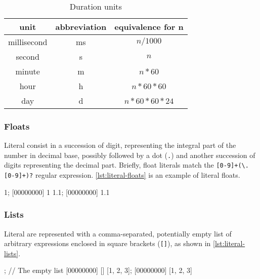 \begin{table}[\floatpos]
  \centering
  \begin{tabular}{|c|c|c|}
    \hline
    unit        & abbreviation & equivalence for n         \\
    \hline
    millisecond & ms           & $n / 1000$         \\
    second      & s            & $n$                \\
    minute      & m            & $n * 60$           \\
    hour        & h            & $n * 60 * 60$      \\
    day         & d            & $n * 60 * 60 * 24$ \\
    \hline
  \end{tabular}
  \caption{Duration units}
  \label{tab:durations}
\end{table}

\subsubsection{Floats}
\label{sec:us-syn-lit-float}

Literal  consist in a succession of digit, representing
the integral part of the number in decimal base, possibly followed by
a dot (\lstinline|.|) and another succession of digits representing
the decimal part. Briefly, float literals match the
\lstinline|[0-9]+(\.[0-9]+)?| regular
expression. \autoref{lst:literal-floats} is an example of literal
floats.

\begin{urbiscript}[caption=Literal floats,label=lst:literal-floats,float=\floatpos]
1;
[00000000] 1
1.1;
[00000000] 1.1
\end{urbiscript}

\subsubsection{Lists}
\label{sec:us-syn-lit-list}

Literal  are represented with a comma-separated, potentially
empty list of arbitrary expressions enclosed in square brackets
(\lstinline|[]|), as shown in \autoref{lst:literal-lists}.

\begin{urbiscript}[caption=Literal lists,label=lst:literal-lists,float=\floatpos]
[]; // The empty list
[00000000] []
[1, 2, 3];
[00000000] [1, 2, 3]
\end{urbiscript}

